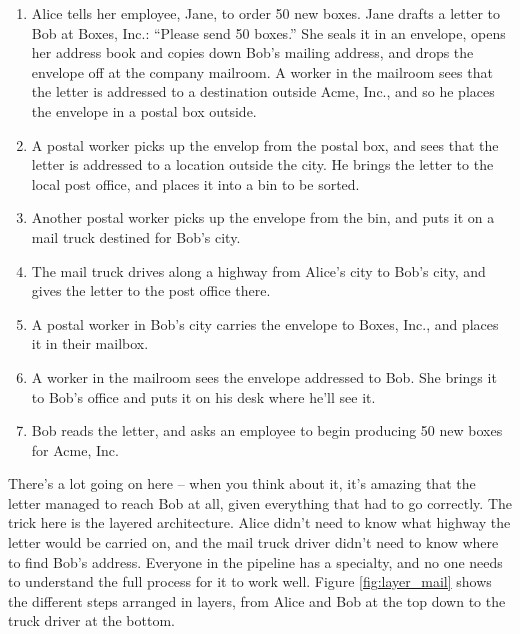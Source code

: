 \begin{enumerate}
    \item Alice tells her employee, Jane, to order 50 new boxes. Jane drafts a letter to Bob at Boxes, Inc.: ``Please send 50 boxes.'' She seals it in an envelope, opens her address book and copies down Bob's mailing address, and drops the envelope off at the company mailroom. A worker in the mailroom sees that the letter is addressed to a destination outside Acme, Inc., and so he places the envelope in a postal box outside.
    \item A postal worker picks up the envelop from the postal box, and sees that the letter is addressed to a location outside the city. He brings the letter to the local post office, and places it into a bin to be sorted.
    \item Another postal worker picks up the envelope from the bin, and puts it on a mail truck destined for Bob's city.
    \item The mail truck drives along a highway from Alice's city to Bob's city, and gives the letter to the post office there.
    \item A postal worker in Bob's city carries the envelope to Boxes, Inc., and places it in their mailbox.
    \item A worker in the mailroom sees the envelope addressed to Bob. She brings it to Bob's office and puts it on his desk where he'll see it.
    \item Bob reads the letter, and asks an employee to begin producing 50 new boxes for Acme, Inc.
\end{enumerate}

There's a lot going on here -- when you think about it, it's amazing that the letter managed to reach Bob at all, given everything that had to go correctly. The trick here is the layered architecture. Alice didn't need to know what highway the letter would be carried on, and the mail truck driver didn't need to know where to find Bob's address. Everyone in the pipeline has a specialty, and no one needs to understand the full process for it to work well. Figure \ref{fig:layer_mail} shows the different steps arranged in layers, from Alice and Bob at the top down to the truck driver at the bottom.

